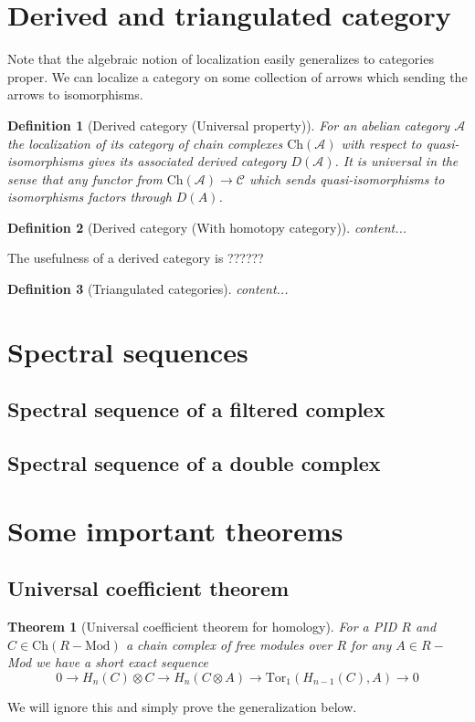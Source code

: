 \documentclass[12pt]{article}
\numberwithin{equation}{section}
\newtheorem{theorem}{Theorem}[section]
\newtheorem{definition}{Definition}[section]
\begin{document}
	\section{Derived and triangulated category}
	
	Note that the algebraic notion of localization easily generalizes to categories proper. We can localize a category on some collection of arrows which sending the arrows to isomorphisms.
	
	\begin{definition}[Derived category (Universal property)]
		For an abelian category $\mathcal{A}$ the localization of its category of chain complexes $\mathrm{Ch}(\mathcal{A})$ with respect to quasi-isomorphisms gives its associated derived category $D(\mathcal{A})$. It is universal in the sense that any functor from $\mathrm{Ch}(\mathcal{A}) \to \mathcal{C}$ which sends quasi-isomorphisms to isomorphisms factors through $D(A)$.
	\end{definition}
	
	\begin{definition}[Derived category (With homotopy category)]
		content...
	\end{definition}
	
	The usefulness of a derived category is ??????
	
	\begin{definition}[Triangulated categories]
		content...
	\end{definition}
	
	\section{Spectral sequences}
	\subsection{Spectral sequence of a filtered complex}
	
	\subsection{Spectral sequence of a double complex}
	
	
	\section{Some important theorems}
	\subsection{Universal coefficient theorem}
	\begin{theorem}[Universal coefficient theorem for homology]
	For a PID $R$ and $C\in \mathrm{Ch}(R-\mathrm{Mod})$ a chain complex of free modules over $R$ for any $A \in R-$Mod we have a short exact sequence \[ 0 \to H_n(C) \otimes C  \to H_n(C\otimes A) \to \mathrm{Tor}_1(H_{n-1}(C),A) \to 0\]
	\end{theorem}
	We will ignore this and simply prove the generalization below.
\end{document}
